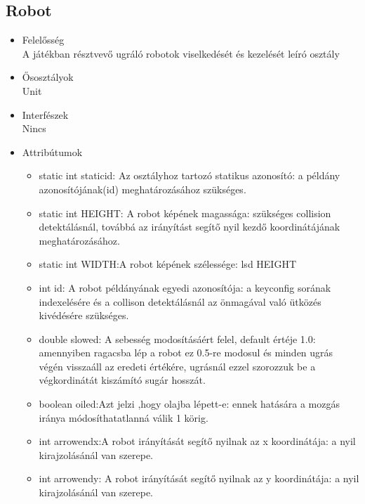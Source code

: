\subsection{Robot}
\begin{itemize}
\item Felelősség\\
\newline
A játékban résztvevő ugráló robotok viselkedését és kezelését leíró osztály
\item Ősosztályok\\
Unit
\item Interfészek\\
Nincs
\item Attribútumok\\
	\begin{itemize}
		\item static int staticid: Az osztályhoz tartozó statikus azonosító: a példány                azonosítójának(id) meghatározásához szükséges.
		\item static int HEIGHT: A robot képének magassága: szükséges collision                      detektálásnál, továbbá az irányítást segítő nyil kezdő koordinátájának                  meghatározásához.
		\item static int WIDTH:A robot képének szélessége: lsd HEIGHT
		\item int id: A robot példányának egyedi azonosítója: a keyconfig sorának                     indexelésére és a collison detektálásnál az önmagával való ütközés                      kivédésére szükséges.
		\item double slowed: A sebesség modosításáért felel, default értéje 1.0: amennyiben ragacsba lép a robot ez 0.5-re modosul és minden ugrás végén visszaáll az eredeti értékére, ugrásnál ezzel szorozzuk be a végkordinátát kiszámító sugár hosszát.
		\item boolean oiled:Azt jelzi ,hogy olajba lépett-e: ennek hatására a mozgás iránya módosíthatatlanná válik 1 körig. 
		\item int arrowendx:A robot irányítását segítő nyilnak az x koordinátája: a nyil kirajzolásánál van szerepe.
		\item int arrowendy: A robot irányítását segítő nyilnak az y koordinátája: a nyil kirajzolásánál van szerepe.

\end{itemize}
\end{itemize}
